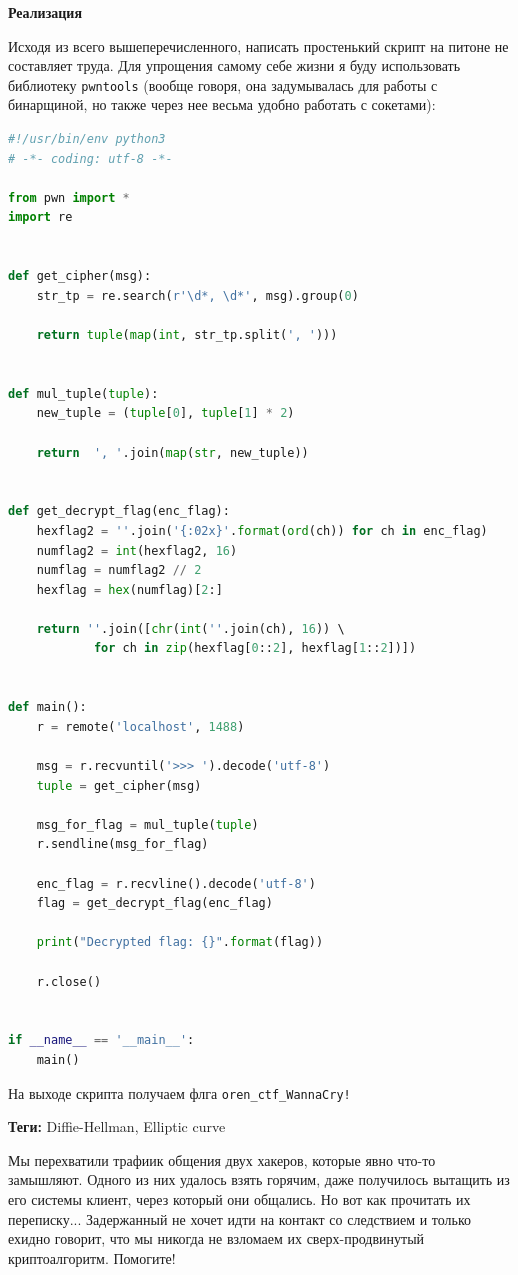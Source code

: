 \documentclass[idxtotoc,hyperref,openany,oneside]{files/crypto} %
\begin{document}
\textbf{Реализация}

Исходя из всего вышеперечисленного, написать простенький скрипт на питоне не составляет труда. Для упрощения самому себе жизни я буду использовать библиотеку \verb|pwntools| (вообще говоря, она задумывалась для работы с бинарщиной, но также через нее весьма удобно работать с сокетами):
\begin{lstlisting}[language=Python, caption=Взлом криптосистемы Эль-Гамаля]
#!/usr/bin/env python3
# -*- coding: utf-8 -*-

from pwn import *
import re


def get_cipher(msg):
    str_tp = re.search(r'\d*, \d*', msg).group(0)

    return tuple(map(int, str_tp.split(', ')))


def mul_tuple(tuple):
    new_tuple = (tuple[0], tuple[1] * 2)

    return  ', '.join(map(str, new_tuple))


def get_decrypt_flag(enc_flag):
    hexflag2 = ''.join('{:02x}'.format(ord(ch)) for ch in enc_flag)
    numflag2 = int(hexflag2, 16)
    numflag = numflag2 // 2
    hexflag = hex(numflag)[2:]

    return ''.join([chr(int(''.join(ch), 16)) \ 
    		for ch in zip(hexflag[0::2], hexflag[1::2])])


def main():
    r = remote('localhost', 1488)

    msg = r.recvuntil('>>> ').decode('utf-8')
    tuple = get_cipher(msg)

    msg_for_flag = mul_tuple(tuple)
    r.sendline(msg_for_flag)

    enc_flag = r.recvline().decode('utf-8')
    flag = get_decrypt_flag(enc_flag)

    print("Decrypted flag: {}".format(flag))

    r.close()


if __name__ == '__main__':
    main()
\end{lstlisting}

На выходе скрипта получаем флга \verb|oren_ctf_WannaCry!|



\textbf{Теги:} Diffie-Hellman, Elliptic curve\vspace{\baselineskip}

\begin{tcolorbox}
Мы перехватили трафиик общения двух хакеров, которые явно что-то замышляют. Одного из них удалось взять горячим, даже получилось вытащить из его системы клиент, через который они общались. Но вот как прочитать их переписку... Задержанный не хочет идти на контакт со следствием и только ехидно говорит, что мы никогда не взломаем их сверх-продвинутый криптоалгоритм. Помогите!
\end{tcolorbox}
\end{document}
